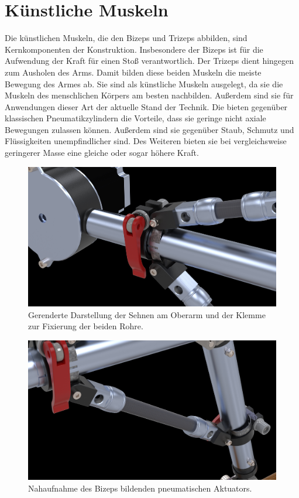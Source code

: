 	\section{Künstliche Muskeln}
		Die künstlichen Muskeln, die den Bizeps und Trizeps abbilden, sind Kernkomponenten der Konstruktion.
		Insbesondere der Bizeps ist für die Aufwendung der Kraft für einen Stoß verantwortlich.
		Der Trizeps dient hingegen zum Ausholen des Arms.
		Damit bilden diese beiden Muskeln die meiste Bewegung des Armes ab.
		Sie sind als künstliche Muskeln ausgelegt, da sie die Muskeln des menschlichen Körpers am besten nachbilden.
		Außerdem sind sie für Anwendungen dieser Art der aktuelle Stand der Technik.
		Die bieten gegenüber klassischen Pneumatikzylindern die Vorteile, dass sie geringe nicht axiale Bewegungen zulassen können.
		Außerdem sind sie gegenüber Staub, Schmutz und Flüssigkeiten unempfindlicher sind.
		Des Weiteren bieten sie bei vergleichsweise geringerer Masse eine gleiche oder sogar höhere Kraft.

		\begin{figure}[h]
			\centering
			\includegraphics[width=\textwidth]{Abb/CAD/Renderings/sehnen_und_schelle.jpg}
			\caption[Gerenderte Darstellung der Sehnen und Sattelklemme]{Gerenderte Darstellung der Sehnen am Oberarm und der Klemme zur Fixierung der beiden Rohre.}%
			\label{fig:rendering sehnen und schellen}
		\end{figure}

		\begin{figure}[h]
			\centering
			\includegraphics[width=\textwidth]{Abb/CAD/Renderings/bizeps.jpg}
			\caption[Nahaufnahme des Bizeps bildenden pneumatischen Aktuators]{Nahaufnahme des Bizeps bildenden pneumatischen Aktuators.}%
			\label{fig:rendering bizeps}
		\end{figure}